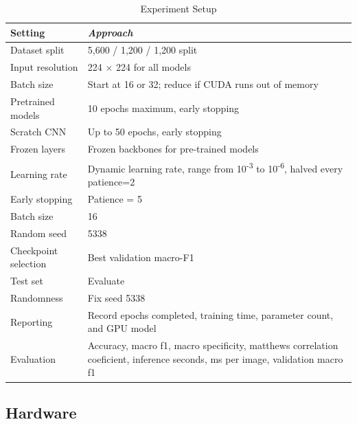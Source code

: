 \documentclass[conference]{IEEEtran}
\begin{document}
\begin{table}[htbp]
\caption{Experiment Setup}
\begin{center}
\begin{tabular}{|m{8em}|m{20em}|}
\hline
\textbf{Setting}&\textit{Approach}\\
\hline
    Dataset split & 5,600 / 1,200 / 1,200 split \\
\hline
    Input resolution & 224 × 224 for all models \\
\hline
    Batch size & Start at 16 or 32; reduce if CUDA runs out of memory \\
\hline
    Pretrained models & 10 epochs maximum, early stopping \\
\hline
    Scratch CNN & Up to 50 epochs, early stopping \\
\hline
    Frozen layers & Frozen backbones for pre-trained models \\
\hline
    Learning rate & Dynamic learning rate, range from 10\textsuperscript{-3} to 10\textsuperscript{-6}, halved every patience=2 \\
\hline
    Early stopping & Patience = 5 \\
\hline
    Batch size & 16 \\
\hline
    Random seed & 5338 \\
\hline
    Checkpoint selection & Best validation macro-F1 \\
\hline
    Test set & Evaluate \\
\hline
    Randomness & Fix seed 5338 \\
\hline
    Reporting & Record epochs completed, training time, parameter count, and GPU model \\
\hline
    Evaluation & Accuracy, macro f1, macro specificity, matthews correlation coeficient, inference seconds, ms per image, validation macro f1 \\
\hline
\end{tabular}
\label{tables:tab3}
\end{center}
\end{table}

\subsection{Hardware}
\end{document}
